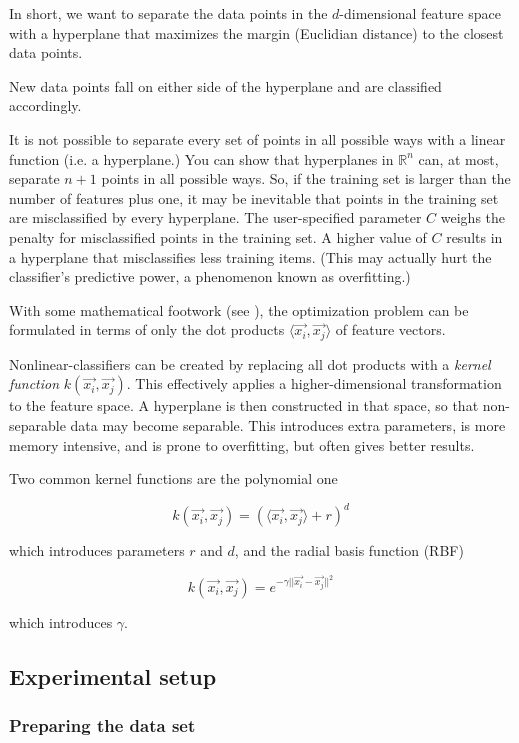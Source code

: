 In short, we want to separate the data points in the $d$-dimensional
feature space with a hyperplane that maximizes the margin (Euclidian
distance) to the closest data points.

New data points fall on either side of the hyperplane and are classified
accordingly.

It is not possible to separate every set of points in all possible ways
with a linear function (i.e. a hyperplane.) You can show that hyperplanes
in $\mathbb{R}^{n}$ can, at most, separate $n + 1$ points in all possible
ways. So, if the training set is larger than the number of features plus
one, it may be inevitable that points in the training set are
misclassified by every hyperplane. The user-specified parameter $C$ weighs
the penalty for misclassified points in the training set. A higher value
of $C$ results in a hyperplane that misclassifies less training items.
(This may actually hurt the classifier's predictive power, a phenomenon
known as overfitting.)

With some mathematical footwork (see \cite{Burges1998}), the optimization
problem can be formulated in terms of only the dot products $\langle
\vec{x_{i}}, \vec{x_{j}} \rangle$ of feature vectors.

Nonlinear-classifiers can be created by replacing all dot products with
a \emph{kernel function} $k(\vec{x_{i}}, \vec{x_{j}})$. This effectively
applies a higher-dimensional transformation to the feature space.
A hyperplane is then constructed in that space, so that
non-separable data may become separable. This introduces extra parameters,
is more memory intensive, and is prone to overfitting, but often gives
better results.

Two common kernel functions are the polynomial one

$$ k(\vec{x_{i}}, \vec{x_{j}}) = ( \langle \vec{x_{i}}, \vec{x_{j}}
\rangle + r )^{d} $$

which introduces parameters $r$ and $d$, and the radial basis
function (RBF)

$$ k(\vec{x_{i}}, \vec{x_{j}}) = e^{-\gamma ||\vec{x_{i}}
- \vec{x_{j}}||^{2}} $$

which introduces $\gamma$.

\subsection{Experimental setup}

\subsubsection{Preparing the data set}

